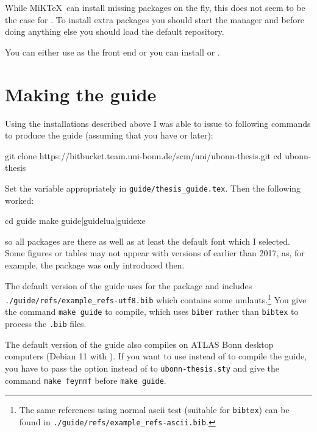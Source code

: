 While MiK\TeX\ can install missing packages on the fly, this does not
seem to be the case for \TeXLive. To install extra packages you should
start the \TeXLive manager and before doing anything else you should
load the default repository.

You can either use \TeXworks as the front end or you can install
\TeXstudio or \TeXmaker.


\section{Making the guide}%
\label{sec:app:guide}

Using the installations described above I was able to issue to following commands to
produce the guide (assuming that you have  or later):
\begin{bashlisting}
git clone https://bitbucket.team.uni-bonn.de/scm/uni/ubonn-thesis.git
cd ubonn-thesis
\end{bashlisting}
\noindent Set the  variable appropriately in \texttt{guide/thesis\_guide.tex}.
\noindent Then the following worked:
\begin{bashlisting}
cd guide
make guide|guidelua|guidexe
\end{bashlisting}
\noindent so all packages are there as well as at least the default font which I selected.
Some figures or tables may not appear with versions of \TeXLive earlier than 2017,
as, for example, the  package was only introduced then.

The default version of the guide uses  for the
 package and includes\\
\texttt{./guide/refs/example\_refs-utf8.bib} which contains some umlauts.\footnote{%
The same references using normal ascii test (suitable for \texttt{bibtex}) can be found in
\texttt{./guide/refs/example\_refs-ascii.bib}.}
You give the command \texttt{make guide} to compile, which uses \texttt{biber} rather than
\texttt{bibtex} to process the \texttt{.bib} files.

The default version of the guide also compiles on ATLAS Bonn desktop
computers (Debian 11 with ). %
If you want to use
 instead of  to compile the guide, you
have to pass the option  instead of  to \texttt{ubonn-thesis.sty} 
and give the command \texttt{make feynmf} before \texttt{make guide}.

